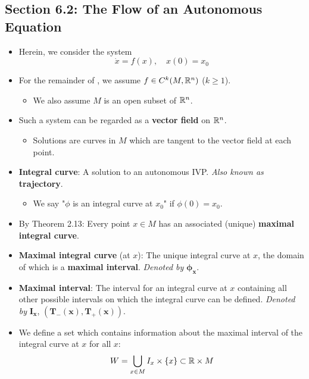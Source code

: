 \documentclass[../notes.tex]{subfiles}
\begin{document}
\subsection*{Section 6.2: The Flow of an Autonomous Equation}
\begin{itemize}
    \item Herein, we consider the system
    \begin{equation*}
        \dot{x} = f(x)
        ,\quad
        x(0) = x_0
    \end{equation*}
    \item For the remainder of \textcite{bib:Teschl}, we assume $f\in C^k(M,\mathbb{R}^n)$ ($k\geq 1$).
    \begin{itemize}
        \item We also assume $M$ is an open subset of $\mathbb{R}^n$.
    \end{itemize}
    \item Such a system can be regarded as a \textbf{vector field} on $\mathbb{R}^n$.
    \begin{itemize}
        \item Solutions are curves in $M$ which are tangent to the vector field at each point.
    \end{itemize}
    \item \textbf{Integral curve}: A solution to an autonomous IVP. \emph{Also known as} \textbf{trajectory}.
    \begin{itemize}
        \item We say "$\phi$ is an integral curve at $x_0$" if $\phi(0)=x_0$.
    \end{itemize}
    \item By Theorem 2.13: Every point $x\in M$ has an associated (unique) \textbf{maximal integral curve}.
    \item \textbf{Maximal integral curve} (at $x$): The unique integral curve at $x$, the domain of which is a \textbf{maximal interval}. \emph{Denoted by} $\bm{\phi_x}$.
    \item \textbf{Maximal interval}: The interval for an integral curve at $x$ containing all other possible intervals on which the integral curve can be defined. \emph{Denoted by} $\bm{I_x}$, $\bm{(T_-(x),T_+(x))}$.
    \item We define a set which contains information about the maximal interval of the integral curve at $x$ for all $x$:
    \begin{equation*}
        W = \bigcup_{x\in M}I_x\times\{x\}
        \subset \mathbb{R}\times M
    \end{equation*}

\end{itemize}
\end{document}
